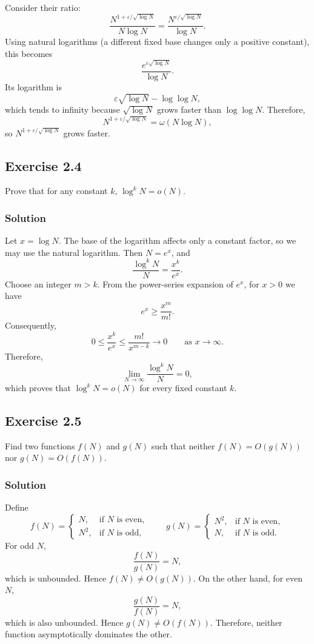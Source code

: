 \documentclass[12pt,a4paper]{article}
\begin{document}
Consider their ratio:
\[
\frac{N^{1+\varepsilon/\sqrt{\log N}}}{N\log N}
=
\frac{N^{\varepsilon/\sqrt{\log N}}}{\log N}.
\]
Using natural logarithms (a different fixed base changes only a positive
constant), this becomes
\[
\frac{e^{\varepsilon\sqrt{\log N}}}{\log N}.
\]
Its logarithm is
\[
\varepsilon\sqrt{\log N}-\log\log N,
\]
which tends to infinity because $\sqrt{\log N}$ grows faster than
$\log\log N$. Therefore,
\[
N^{1+\varepsilon/\sqrt{\log N}}
=\omega(N\log N),
\]
so $N^{1+\varepsilon/\sqrt{\log N}}$ grows faster.

\subsection*{\color{sectionnavy}Exercise 2.4}

\noindent
Prove that for any constant $k$, $\log^k N=o(N)$.

\subsubsection*{\color{sectionnavy}Solution}

Let $x=\log N$. The base of the logarithm affects only a constant
factor, so we may use the natural logarithm. Then $N=e^x$, and
\[
\frac{\log^k N}{N}=\frac{x^k}{e^x}.
\]
Choose an integer $m>k$. From the power-series expansion of $e^x$,
for $x>0$ we have
\[
e^x\geq \frac{x^m}{m!}.
\]
Consequently,
\[
0\leq \frac{x^k}{e^x}
\leq \frac{m!}{x^{m-k}}
\longrightarrow 0
\qquad\text{as }x\to\infty.
\]
Therefore,
\[
\lim_{N\to\infty}\frac{\log^k N}{N}=0,
\]
which proves that $\log^k N=o(N)$ for every fixed constant $k$.

\subsection*{\color{sectionnavy}Exercise 2.5}

\noindent
Find two functions $f(N)$ and $g(N)$ such that neither
$f(N)=O(g(N))$ nor $g(N)=O(f(N))$.

\subsubsection*{\color{sectionnavy}Solution}

Define
\[
f(N)=
\begin{cases}
N,   & \text{if $N$ is even},\\
N^2, & \text{if $N$ is odd},
\end{cases}
\qquad
g(N)=
\begin{cases}
N^2, & \text{if $N$ is even},\\
N,   & \text{if $N$ is odd}.
\end{cases}
\]
For odd $N$,
\[
\frac{f(N)}{g(N)}=N,
\]
which is unbounded. Hence $f(N)\neq O(g(N))$. On the other hand, for
even $N$,
\[
\frac{g(N)}{f(N)}=N,
\]
which is also unbounded. Hence $g(N)\neq O(f(N))$. Therefore, neither
function asymptotically dominates the other.
\end{document}
